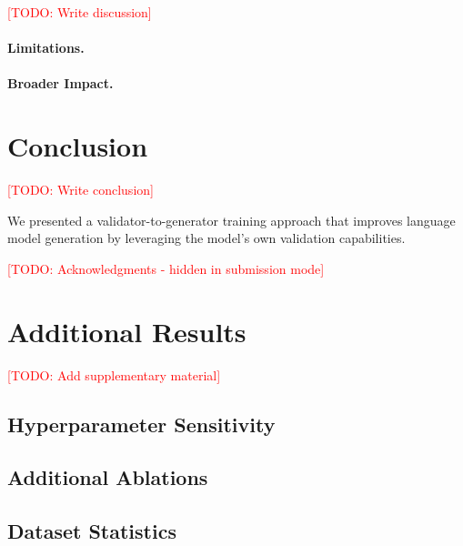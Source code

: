 \documentclass{article}
\newcommand{\todo}[1]{\textcolor{red}{[TODO: #1]}}
\begin{document}
\todo{Write discussion}

\paragraph{Limitations.}

\paragraph{Broader Impact.}


\section{Conclusion}
\label{sec:conclusion}

\todo{Write conclusion}

We presented a validator-to-generator training approach that improves language model generation by leveraging the model's own validation capabilities.


\begin{ack}
\todo{Acknowledgments - hidden in submission mode}
\end{ack}


{
\small


}


\appendix

\section{Additional Results}
\label{app:additional}

\todo{Add supplementary material}

\subsection{Hyperparameter Sensitivity}

\subsection{Additional Ablations}

\subsection{Dataset Statistics}
\end{document}
